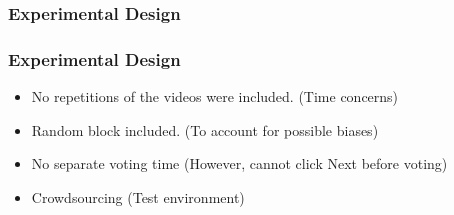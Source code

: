\documentclass{beamer}
\begin{document}
\begin{frame}
\frametitle{Experimental Design}
	\begin{figure}
		\centering
	\end{figure}   
\end{frame}

\begin{frame}
\frametitle{Experimental Design}
	\begin{itemize}
		\item No repetitions of the videos were included. (Time concerns)
		\item Random block included. (To account for possible biases)
		\item No separate voting time (However, cannot click Next before voting)
        \item Crowdsourcing (Test environment)
	\end{itemize}
\end{frame}
\end{document}
